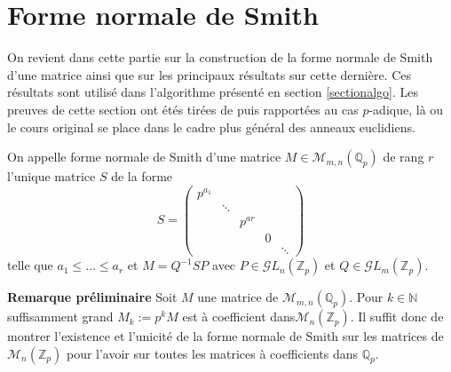 \section{Forme normale de Smith}
\label{smith} 
On revient dans cette partie sur la construction de la forme normale de Smith d'une matrice ainsi que sur les principaux résultats sur cette dernière. Ces résultats sont utilisé dans l'algorithme présenté en section \ref{sectionalgo}.  Les preuves de cette section ont étés tirées de \cite{howard_rings_nodate}  puis rapportées au cas $p$-adique, là ou le cours original se place dans le cadre plus général des anneaux euclidiens.



\begin{rappel}
	On appelle forme normale de Smith d'une matrice $M \in \mathcal{M}_{m,n}\left(\mathbb{Q}_{p} \right) $ de rang $r$ l'unique matrice $S$ de la forme $$S =  
	\begin{pmatrix} p^{a_1} & \\
		 & \ddots \\
		 & & p^{ar}\\
		 & & & 0\\
		 & & & & \ddots \end{pmatrix} $$
		 telle que $a_1\le  \ldots\le a_r$ et $M =  Q^{-1} S P$ avec $P \in \mathcal{G}L_n\left( \mathbb{Z}_p \right) $ et $Q \in \mathcal{G}L_m\left( \mathbb{Z}_p \right) $.
\end{rappel}
\textbf{Remarque préliminaire} 
Soit $M$ une matrice de $\mathcal{M}_{m,n}\left(\mathbb{Q}_{p} \right) $. Pour $k \in \mathbb{N}$ suffisamment grand $M_k := p^k M$ est à coefficient dans$\mathcal{M}_{n}\left(\mathbb{Z}_p\right)$. Il suffit donc de montrer l'existence et l'unicité de la forme normale de Smith sur les matrices de $\mathcal{M}_{n}\left(\mathbb{Z}_p\right) $ pour l'avoir sur toutes les matrices à coefficients dans $\mathbb{Q}_{p}$.

